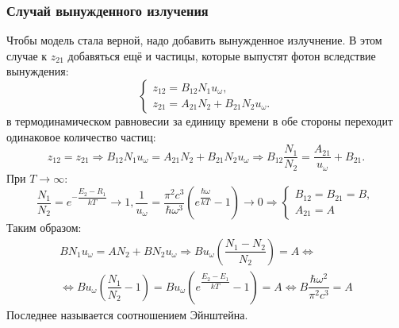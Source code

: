 \subsubsection{Случай вынужденного излучения}
Чтобы модель стала верной, надо добавить вынужденное излучнение. В этом случае к $z_{21}$ добавяться
ещё и частицы, которые выпустят фотон вследствие вынуждения:
\[
  \begin{cases}
    z_{12} = B_{12} N_1 u_\omega, \\
    z_{21} = A_{21} N_2 + B_{21} N_2 u_\omega.
  \end{cases}
\]
в термодинамическом равновесии за единицу времени в обе стороны переходит одинаковое количество 
частиц:
\begin{equation}\label{write_1:good_einstein}
  z_{12} = z_{21} \Rightarrow
  B_{12} N_1 u_\omega = A_{21} N_2 + B_{21} N_2 u_\omega
  \Rightarrow
  B_{12} \dfrac{N_1}{N_2} = \dfrac{A_{21}}{u_\omega} + B_{21}.
\end{equation}
При $T \to \infty$:
\[
  \dfrac{N_1}{N_2} = e^{- \dfrac{E_2-R_1}{kT}} \to 1,
  \dfrac{1}{u_\omega} = \dfrac{\pi^2 c^3}{\hbar \omega^3} \left(e^{\dfrac{\hbar \omega}{kT}} - 1\right) \to 0
  \Rightarrow
  \begin{cases}
    B_{12} = B_{21} = B, \\
    A_{21} = A 
  \end{cases}
\]
Таким образом:
\begin{multline*}
  B N_1 u_\omega = A N_2 + B N_2 u_\omega
  \Rightarrow
  B u_\omega \left( \dfrac{N_1-N_2}{N_2} \right) = A
  \Leftrightarrow \\
  \Leftrightarrow
  B u_\omega \left( \dfrac{N_1}{N_2} - 1 \right) = B u_\omega \left( e^{\dfrac{E_2-E_1}{kT}} - 1 \right) = A
  \Leftrightarrow
  B \dfrac{\hbar \omega^2}{\pi^2 c^3} = A
\end{multline*}
Последнее называется соотношением Эйнштейна.
